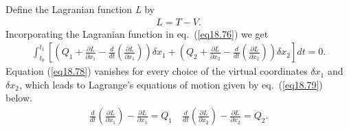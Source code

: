 \documentclass{AeroStructure-ERJohnson}
\begin{document}
Define the Lagranian function \textit{L} by
\begin{align}\label{eq18.77}
L=T-V.
\end{align}
Incorporating the Lagranian function in eq.~(\ref{eq18.76}) we get
\begin{align}\label{eq18.78}
\int_{t_{0}}^{t_{1}}\left[\left(Q_{1}+\frac{\partial L}{\partial x_{1}}-\frac{d}{d t}\left(\frac{\partial L}{\partial \dot{x}_{1}}\right)\right) \delta x_{1}+\left(Q_{2}+\frac{\partial L}{\partial x_{2}}-\frac{d}{d t}\left(\frac{\partial L}{\partial \dot{x}_{2}}\right)\right) \delta x_{2}\right] d t=0.
\end{align}
Equation (\ref{eq18.78}) vanishes for every choice of the virtual coordinates $\delta x_{1}$ and $\delta x_{2}$, which leads to Lagrange's equations of motion given by eq.~(\ref{eq18.79}) below.
\begin{align}\label{eq18.79}
\frac{d}{d t}\left(\frac{\partial L}{\partial \dot{x}_{1}}\right)-\frac{\partial L}{\partial x_{1}}=Q_{1} \quad \frac{d}{d t}\left(\frac{\partial L}{\partial \dot{x}_{2}}\right)-\frac{\partial L}{\partial x_{2}}=Q_{2}.
\end{align}

\vspace*{-1pc}
\end{document}
